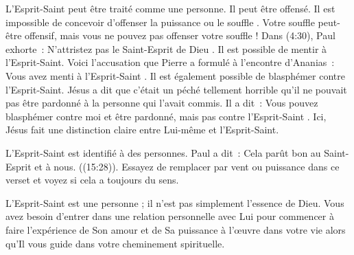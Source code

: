 L'Esprit-Saint peut être traité comme une personne. Il peut être offensé. Il est impossible de concevoir d'offenser \og la puissance \fg{} ou \og le souffle \fg{}. Votre souffle peut-être offensif, mais vous ne pouvez pas offenser votre souffle ! Dans (4:30), Paul exhorte~: \og N'attristez pas le Saint-Esprit de Dieu \fg{}. Il est possible de mentir à l'Esprit-Saint. Voici l'accusation que Pierre a formulé à l'encontre d'Ananias~: \og Vous avez menti à l'Esprit-Saint \fg{}. Il est également possible de blasphémer contre l'Esprit-Saint. Jésus a dit que c'était un péché tellement horrible qu'il ne pouvait pas être pardonné à la personne qui l'avait commis. Il a dit~: \og Vous pouvez blasphémer contre moi et être pardonné, mais pas contre l'Esprit-Saint \fg{}. Ici, Jésus fait une distinction claire entre Lui-même et l'Esprit-Saint.

L'Esprit-Saint est identifié à des personnes. Paul a dit~: \og Cela parût bon au Saint-Esprit et à nous. \fg{} ((15:28)). Essayez de remplacer par vent ou puissance dans ce verset et voyez si cela a toujours du sens.

L'Esprit-Saint est une personne ; il n'est pas simplement l'essence de Dieu. Vous avez besoin d'entrer dans une relation personnelle avec Lui pour commencer à faire l'expérience de Son amour et de Sa puissance à l'œuvre dans votre vie alors qu'Il vous guide dans votre cheminement spirituelle.



